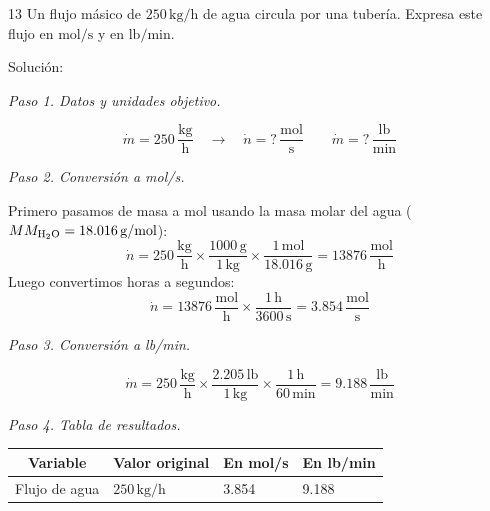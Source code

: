 \begin{exercise}{13}{}
Un flujo másico de $250\,\mathrm{kg/h}$ de agua circula por una
tubería. Expresa este flujo en $\mathrm{mol/s}$ y en
$\mathrm{lb/min}$.

Solución:

\textit{Paso 1. Datos y unidades objetivo.}

\[
\dot{m} = 250\,\frac{\mathrm{kg}}{\mathrm{h}}
\quad \longrightarrow \quad
\dot{n} = ?\,\frac{\mathrm{mol}}{\mathrm{s}}
\qquad
\dot{m} = ?\,\frac{\mathrm{lb}}{\mathrm{min}}
\]

\textit{Paso 2. Conversión a mol/s.}

Primero pasamos de masa a mol usando la masa molar del agua
($MM_{\ce{H2O}} = 18.016\,\mathrm{g/mol}$):
\[
\dot{n} = 250\,\frac{\mathrm{kg}}{\mathrm{h}}
\times \frac{1000\,\mathrm{g}}{1\,\mathrm{kg}}
\times \frac{1\,\mathrm{mol}}{18.016\,\mathrm{g}}
= 13876\,\frac{\mathrm{mol}}{\mathrm{h}}
\]
Luego convertimos horas a segundos:
\[
\dot{n} = 13876\,\frac{\mathrm{mol}}{\mathrm{h}}
\times \frac{1\,\mathrm{h}}{3600\,\mathrm{s}}
= 3.854\,\frac{\mathrm{mol}}{\mathrm{s}}
\]

\textit{Paso 3. Conversión a lb/min.}

\[
\dot{m} = 250\,\frac{\mathrm{kg}}{\mathrm{h}}
\times \frac{2.205\,\mathrm{lb}}{1\,\mathrm{kg}}
\times \frac{1\,\mathrm{h}}{60\,\mathrm{min}}
= 9.188\,\frac{\mathrm{lb}}{\mathrm{min}}
\]

\textit{Paso 4. Tabla de resultados.}

\begin{center}
\renewcommand{\arraystretch}{1.6}
\begin{tabularx}{\textwidth}{|c|X|X|X|}
\hline
\textbf{Variable} & \textbf{Valor original} &
\textbf{En mol/s} & \textbf{En lb/min} \\
\hline
Flujo de agua & $250\,\mathrm{kg/h}$ & 3.854 & 9.188 \\
\hline
\end{tabularx}
\end{center}

\end{exercise}

